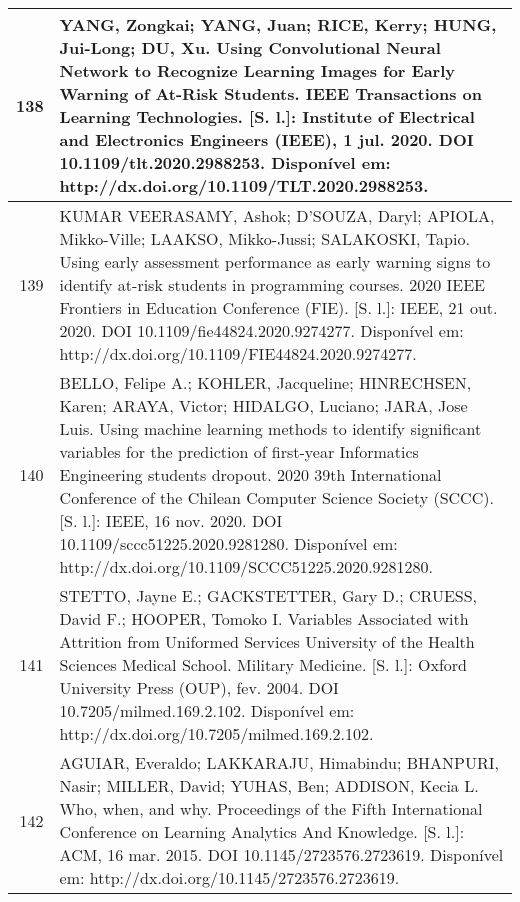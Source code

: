 \begin{apendicesenv}
\begin{longtable}[c]{|r|l|}
138 &
  \multicolumn{1}{p{14.5cm}|}{YANG, Zongkai; YANG, Juan; RICE, Kerry; HUNG, Jui-Long; DU, Xu. Using Convolutional Neural Network to Recognize Learning Images for Early Warning of At-Risk Students. IEEE Transactions on Learning Technologies. {[}S. l.{]}: Institute of Electrical and Electronics Engineers (IEEE), 1 jul. 2020. DOI 10.1109/tlt.2020.2988253. Disponível em: http://dx.doi.org/10.1109/TLT.2020.2988253.} \\ \hline
139 &
  \multicolumn{1}{p{14.5cm}|}{KUMAR VEERASAMY, Ashok; D’SOUZA, Daryl; APIOLA, Mikko-Ville; LAAKSO, Mikko-Jussi; SALAKOSKI, Tapio. Using early assessment performance as early warning signs to identify at-risk students in programming courses. 2020 IEEE Frontiers in Education Conference (FIE). {[}S. l.{]}: IEEE, 21 out. 2020. DOI 10.1109/fie44824.2020.9274277. Disponível em: http://dx.doi.org/10.1109/FIE44824.2020.9274277.} \\ \hline
140 &
  \multicolumn{1}{p{14.5cm}|}{BELLO, Felipe A.; KOHLER, Jacqueline; HINRECHSEN, Karen; ARAYA, Victor; HIDALGO, Luciano; JARA, Jose Luis. Using machine learning methods to identify significant variables for the prediction of first-year Informatics Engineering students dropout. 2020 39th International Conference of the Chilean Computer Science Society (SCCC). {[}S. l.{]}: IEEE, 16 nov. 2020. DOI 10.1109/sccc51225.2020.9281280. Disponível em: http://dx.doi.org/10.1109/SCCC51225.2020.9281280.} \\ \hline
141 &
  \multicolumn{1}{p{14.5cm}|}{STETTO, Jayne E.; GACKSTETTER, Gary D.; CRUESS, David F.; HOOPER, Tomoko I. Variables Associated with Attrition from Uniformed Services University of the Health Sciences Medical School. Military Medicine. {[}S. l.{]}: Oxford University Press (OUP), fev. 2004. DOI 10.7205/milmed.169.2.102. Disponível em: http://dx.doi.org/10.7205/milmed.169.2.102.} \\ \hline
142 &
  \multicolumn{1}{p{14.5cm}|}{AGUIAR, Everaldo; LAKKARAJU, Himabindu; BHANPURI, Nasir; MILLER, David; YUHAS, Ben; ADDISON, Kecia L. Who, when, and why. Proceedings of the Fifth International Conference on Learning Analytics And Knowledge. {[}S. l.{]}: ACM, 16 mar. 2015. DOI 10.1145/2723576.2723619. Disponível em: http://dx.doi.org/10.1145/2723576.2723619.} \\ \hline
\end{longtable}


\end{apendicesenv}
